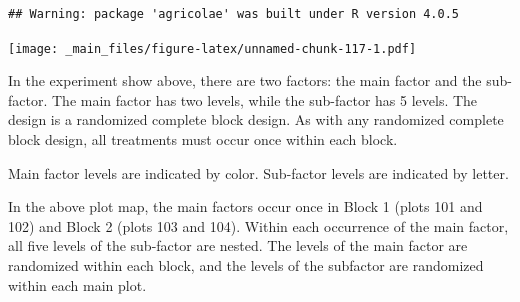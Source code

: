\documentclass[
]{book}
\newenvironment{Shaded}{\begin{snugshade}}{\end{snugshade}}
\newcommand{\AttributeTok}[1]{\textcolor[rgb]{0.77,0.63,0.00}{#1}}
\newcommand{\DecValTok}[1]{\textcolor[rgb]{0.00,0.00,0.81}{#1}}
\newcommand{\FunctionTok}[1]{\textcolor[rgb]{0.00,0.00,0.00}{#1}}
\newcommand{\NormalTok}[1]{#1}
\newcommand{\OtherTok}[1]{\textcolor[rgb]{0.56,0.35,0.01}{#1}}
\newcommand{\SpecialCharTok}[1]{\textcolor[rgb]{0.00,0.00,0.00}{#1}}
\newcommand{\StringTok}[1]{\textcolor[rgb]{0.31,0.60,0.02}{#1}}
\begin{document}
\begin{verbatim}
## Warning: package 'agricolae' was built under R version 4.0.5
\end{verbatim}

\begin{Shaded}
\end{Shaded}

\texttt{[image: \_main\_files/figure-latex/unnamed-chunk-117-1.pdf]}

In the experiment show above, there are two factors: the main factor and the sub-factor. The main factor has two levels, while the sub-factor has 5 levels. The design is a randomized complete block design. As with any randomized complete block design, all treatments must occur once within each block.

Main factor levels are indicated by color. Sub-factor levels are indicated by letter.

In the above plot map, the main factors occur once in Block 1 (plots 101 and 102) and Block 2 (plots 103 and 104). Within each occurrence of the main factor, all five levels of the sub-factor are nested. The levels of the main factor are randomized within each block, and the levels of the subfactor are randomized within each main plot.
\end{document}
